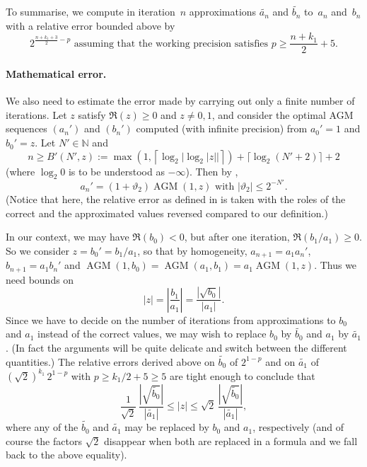 \documentclass [11pt]{article}
\newcommand {\corr}[1]{{#1}}
\newcommand {\appro}[1]{\widetilde {#1}}
\newcommand {\N}{\mathbb N}
\renewcommand {\theta}{\vartheta}
\renewcommand {\leq}{\leqslant}
\renewcommand {\geq}{\geqslant}
\newcommand {\AGM}{\operatorname{AGM}}
\begin{document}
\noindent
To summarise, we compute in iteration~$n$ approximations $\appro {a_n}$
and $\appro {b_n}$ to~$a_n$ and~$b_n$ with a relative error bounded above by
\begin {equation}
\label {eq:agmprec}
2^{\frac {n + k_1 + 3}{2} - p}
\text { assuming that the working precision satisfies }
p \geq \frac {n + k_1}{2} + 5.
\end {equation}


\paragraph {Mathematical error.}

We also need to estimate the error made by carrying out only a finite number
of iterations. Let $z$ satisfy $\Re (z) \geq 0$ and $z \neq 0, 1$, and
consider the optimal AGM sequences $(a_n')$ and $(b_n')$ computed (with
infinite precision) from $a_0' = 1$ and $b_0' = z$. Let $N' \in \N$ and
\[
n \geq B' (N', z)
  := \max \left( 1, \left\lceil \log_2 \big| \log_2 |z| \big|
     \right\rceil \right)
        + \lceil \log_2 (N'+2) \rceil + 2
\]
(where $\log_2 0$ is to be understood as $- \infty$).
Then by \cite[Prop.~3.3, p.~88]{Dupont06},
\[
a_n' = (1 + \theta_2) \AGM (1, z)
\text { with }
|\theta_2| \leq 2^{-N'}.
\]
(Notice that here, the relative error as defined in
\cite[Def.~1.2, p.~20]{Dupont06} is taken with the roles of the correct
and the approximated values reversed compared to our definition.)

In our context, we may have $\Re (\corr {b_0}) < 0$, but after one iteration,
$\Re (\corr {b_1} / \corr {a_1}) \geq 0$. So we consider
$\corr {z} = b_0' = \corr {b_1} / \corr {a_1}$, so that by
homogeneity, $\corr {a_{n+1}} = \corr {a_1} a_n'$,
$\corr {b_{n+1}} = \corr {a_1} b_n'$ and
$\AGM (1, \corr {b_0}) = \AGM (\corr {a_1}, \corr {b_1})
= \corr {a_1} \AGM (1, \corr {z})$.
Thus we need bounds on
\[
|z|
= \left| \frac {\corr {b_1}}{\corr {a_1}} \right|
= \frac {|\sqrt {\corr {b_0}}|}{|\corr {a_1}|}.
\]
Since we have to decide on the number of iterations from approximations
to $b_0$ and $a_1$ instead of the correct values, we may wish to replace
$b_0$ by $\appro {b_0}$ and $a_1$ by $\appro {a_1}$. (In fact the
arguments will be quite delicate and switch between the different
quantities.) The relative errors derived above on $\appro {b_0}$ of
$2^{1-p}$ and on $\appro {a_1}$ of $(\sqrt 2)^{k_1} \, 2^{1-p}$ with
$p \geq k_1 / 2 + 5 \geq 5$ are tight enough to conclude that
\begin {equation}
\label {eq:agmabsz}
\frac {1}{\sqrt 2} \,
\frac {\left| \sqrt {\appro {b_0}} \right|}{|\appro {a_1}|}
\leq
|z|
\leq
\sqrt 2 \,  \frac {\left| \sqrt {\appro {b_0}} \right|}{|\appro {a_1}|},
\end {equation}
where any of the $\appro {b_0}$ and $\appro {a_1}$ may be replaced by
$b_0$ and $a_1$, respectively (and of course the factors $\sqrt 2$
disappear when both are replaced in a formula and we fall back to the
above equality).
\end{document}
